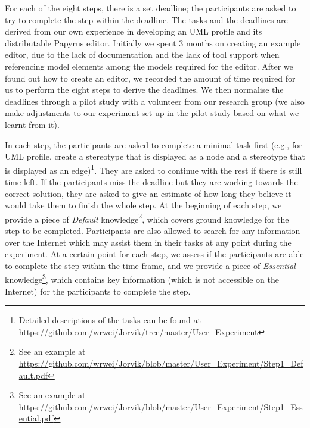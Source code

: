 For each of the eight steps, there is a set deadline; the participants are asked to try to complete the step within the deadline.
The tasks and the deadlines are derived from our own experience in developing an UML profile and its distributable Papyrus editor. 
Initially we spent 3 months on creating an example editor, due to the lack of documentation and the lack of tool support when referencing model elements among the models required for the editor.
After we found out how to create an editor, we recorded the amount of time required for us to perform the eight steps to derive the deadlines. 
We then normalise the deadlines through a pilot study with a volunteer from our research group (we also make adjustments to our experiment set-up in the pilot study based on what we learnt from it). 

In each step, the participants are asked to complete a minimal task first (e.g., for UML profile, create a stereotype that is displayed as a node and a stereotype that is displayed as an edge)\footnote{Detailed descriptions of the tasks can be found at \url{https://github.com/wrwei/Jorvik/tree/master/User_Experiment}}. 
They are asked to continue with the rest if there is still time left. 
If the participants miss the deadline but they are working towards the correct solution, they are asked to give an estimate of how long they believe it would take them to finish the whole step.
At the beginning of each step, we provide a piece of \textit{Default} knowledge\footnote{See an example at \url{https://github.com/wrwei/Jorvik/blob/master/User_Experiment/Step1_Default.pdf}}, which covers ground knowledge for the step to be completed. 
Participants are also allowed to search for any information over the Internet which may assist them in their tasks at any point during the experiment.
At a certain point for each step, we assess if the participants are able to complete the step within the time frame, and we provide a piece of \textit{Essential} knowledge\footnote{See an example at \url{https://github.com/wrwei/Jorvik/blob/master/User_Experiment/Step1_Essential.pdf}}, which contains key information (which is not accessible on the Internet) for the participants to complete the step.

